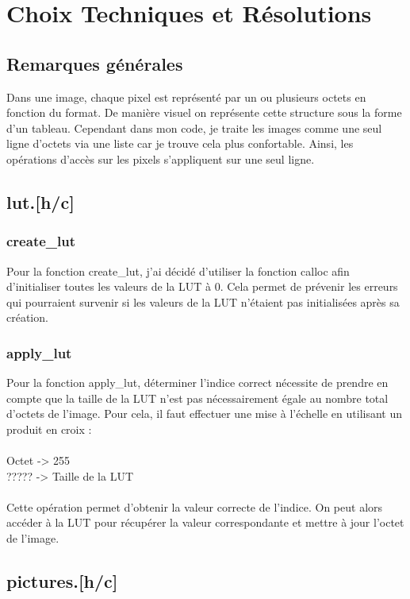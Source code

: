 \documentclass[12pt,a4paper]{article}
\begin{document}
\section{Choix Techniques et Résolutions}
\subsection{Remarques générales}
Dans une image, chaque pixel est représenté par un ou plusieurs octets en fonction du format. De manière visuel on représente cette structure sous la forme d'un tableau. Cependant dans mon code, je traite les images comme une seul ligne d'octets via une liste car je trouve cela plus confortable. Ainsi, les opérations d'accès sur les pixels s'appliquent sur une seul ligne.\\
\subsection{lut.[h/c]}
\subsubsection{create\_lut}
Pour la fonction create\_lut, j'ai décidé d'utiliser la fonction calloc afin d'initialiser toutes les valeurs de la LUT à 0. Cela permet de prévenir les erreurs qui pourraient survenir si les valeurs de la LUT n'étaient pas initialisées après sa création.
\subsubsection{apply\_lut}
Pour la fonction apply\_lut, déterminer l'indice correct nécessite de prendre en compte que la taille de la LUT n'est pas nécessairement égale au nombre total d'octets de l'image. Pour cela, il faut effectuer une mise à l'échelle en utilisant un produit en croix :\\
\\
Octet -> 255 \\
????? -> Taille de la LUT \\
\\
Cette opération permet d'obtenir la valeur correcte de l'indice. On peut alors accéder à la LUT pour récupérer la valeur correspondante et mettre à jour l'octet de l'image.
\subsection{pictures.[h/c]}
\end{document}
